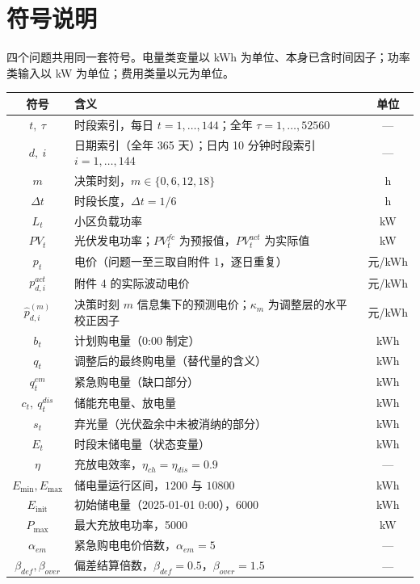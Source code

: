 \section{符号说明}

四个问题共用同一套符号。电量类变量以 kWh 为单位、本身已含时间因子；功率类输入以 kW 为单位；费用类量以元为单位。

\begin{center}
\small
\begin{tabular}{clc}
\toprule
符号 & 含义 & 单位 \\
\midrule
$t,\ \tau$ & 时段索引，每日 $t=1,\dots,144$；全年 $\tau=1,\dots,52560$ & --- \\
$d,\ i$ & 日期索引（全年 365 天）；日内 10 分钟时段索引 $i=1,\dots,144$ & --- \\
$m$ & 决策时刻，$m\in\{0,6,12,18\}$ & h \\
$\Delta t$ & 时段长度，$\Delta t=1/6$ & h \\
$L_t$ & 小区负载功率 & kW \\
$PV_t$ & 光伏发电功率；$PV^{fc}_t$ 为预报值，$PV^{act}_t$ 为实际值 & kW \\
$p_t$ & 电价（问题一至三取自附件 1，逐日重复） & 元/kWh \\
$p^{act}_{d,i}$ & 附件 4 的实际波动电价 & 元/kWh \\
$\hat p^{(m)}_{d,i}$ & 决策时刻 $m$ 信息集下的预测电价；$\kappa_m$ 为调整层的水平校正因子 & 元/kWh \\
$b_t$ & 计划购电量（0:00 制定） & kWh \\
$q_t$ & 调整后的最终购电量（替代量的含义） & kWh \\
$q^{em}_t$ & 紧急购电量（缺口部分） & kWh \\
$c_t,\ q^{dis}_t$ & 储能充电量、放电量 & kWh \\
$s_t$ & 弃光量（光伏盈余中未被消纳的部分） & kWh \\
$E_t$ & 时段末储电量（状态变量） & kWh \\
$\eta$ & 充放电效率，$\eta_{ch}=\eta_{dis}=0.9$ & --- \\
$E_{\min},E_{\max}$ & 储电量运行区间，$1200$ 与 $10800$ & kWh \\
$E_{\text{init}}$ & 初始储电量（2025-01-01 0:00），6000 & kWh \\
$P_{\max}$ & 最大充放电功率，5000 & kW \\
$\alpha_{em}$ & 紧急购电电价倍数，$\alpha_{em}=5$ & --- \\
$\beta_{def},\beta_{over}$ & 偏差结算倍数，$\beta_{def}=0.5$，$\beta_{over}=1.5$ & --- \\

\end{tabular}
\end{center}
